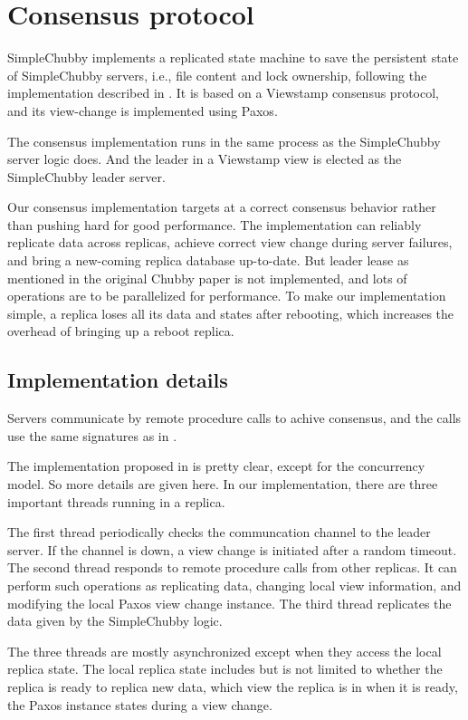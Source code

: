 \section{Consensus protocol}

SimpleChubby implements a replicated state machine to save the persistent
state of SimpleChubby servers, i.e., file content and lock ownership,
following the implementation described in \cite{mazieres2007paxos}.
It is based on a Viewstamp consensus protocol\cite{oki1988viewstamped}, and its view-change is implemented using Paxos\cite{lamport2001paxos}.

The consensus implementation runs in the same process
as the SimpleChubby server logic does.
And the leader in a Viewstamp view is elected as the SimpleChubby leader server.

Our consensus implementation targets at a correct consensus behavior
rather than pushing hard for good performance.
The implementation can reliably replicate data across replicas,
achieve correct view change during server failures,
and bring a new-coming replica database up-to-date.
But leader lease as mentioned in the original Chubby paper is
not implemented,
and lots of operations are to be parallelized for performance.
To make our implementation simple,
a replica loses all its data and states after rebooting,
which increases the overhead of bringing up a reboot replica.

\subsection{Implementation details}

Servers communicate by remote procedure calls to achive consensus,
and the calls use the same signatures as in \cite{mazieres2007paxos}.

The implementation proposed in \cite{mazieres2007paxos} is pretty clear,
except for the concurrency model. So more details are given here.
In our implementation, there are three important threads running in a replica.

The first thread periodically checks the communcation channel
to the leader server.
If the channel is down,
a view change is initiated after a random timeout.
The second thread responds to remote procedure calls from other replicas.
It can perform such operations as replicating data,
changing local view information,
and modifying the local Paxos view change instance.
The third thread replicates the data given by the SimpleChubby logic.

The three threads are mostly asynchronized except when they access
the local replica state. The local replica state includes but is not
limited to
whether the replica is ready to replica new data,
which view the replica is in when it is ready,
the Paxos instance states during a view change.
